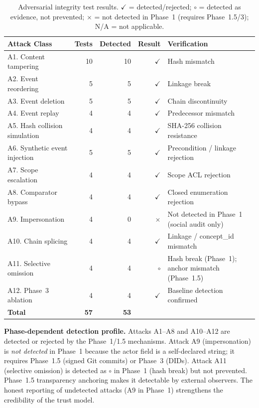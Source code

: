 \begin{table}[htbp]
\centering
\small
\caption{Adversarial integrity test results. \texorpdfstring{$\checkmark$}{checkmark} = detected/rejected; \texorpdfstring{$\circ$}{circle} = detected as evidence, not prevented; \texorpdfstring{$\times$}{cross} = not detected in Phase~1 (requires Phase~1.5/3); N/A = not applicable.}
\label{tab:adversarial-results-appendix}
\begin{tabular}{@{}p{2.5cm}rrrp{4cm}@{}}
\toprule
\textbf{Attack Class} & \textbf{Tests} & \textbf{Detected} & \textbf{Result} & \textbf{Verification} \\
\midrule
A1. Content tampering & 10 & 10 & $\checkmark$ & Hash mismatch \\
A2. Event reordering & 5 & 5 & $\checkmark$ & Linkage break \\
A3. Event deletion & 5 & 5 & $\checkmark$ & Chain discontinuity \\
A4. Event replay & 4 & 4 & $\checkmark$ & Predecessor mismatch \\
A5. Hash collision simulation & 4 & 4 & $\checkmark$ & SHA-256 collision resistance \\
A6. Synthetic event injection & 5 & 5 & $\checkmark$ & Precondition / linkage rejection \\
A7. Scope escalation & 4 & 4 & $\checkmark$ & Scope ACL rejection \\
A8. Comparator bypass & 4 & 4 & $\checkmark$ & Closed enumeration rejection \\
A9. Impersonation & 4 & 0 & $\times$ & Not detected in Phase~1 (social audit only) \\
A10. Chain splicing & 4 & 4 & $\checkmark$ & Linkage / concept\_id mismatch \\
A11. Selective omission & 4 & 4 & $\circ$ & Hash break (Phase~1); anchor mismatch (Phase~1.5) \\
A12. Phase~3 ablation & 4 & 4 & $\checkmark$ & Baseline detection confirmed \\
\midrule
\textbf{Total} & \textbf{57} & \textbf{53} & & \\
\bottomrule
\end{tabular}
\end{table}

\textbf{Phase-dependent detection profile.} Attacks A1--A8 and A10--A12 are detected or rejected by the Phase~1/1.5 mechanisms. Attack A9 (impersonation) is \emph{not detected} in Phase~1 because the actor field is a self-declared string; it requires Phase~1.5 (signed Git commits) or Phase~3 (DIDs). Attack A11 (selective omission) is detected as $\circ$ in Phase~1 (hash break) but not prevented. Phase~1.5 transparency anchoring makes it detectable by external observers. The honest reporting of undetected attacks (A9 in Phase~1) strengthens the credibility of the trust model.

